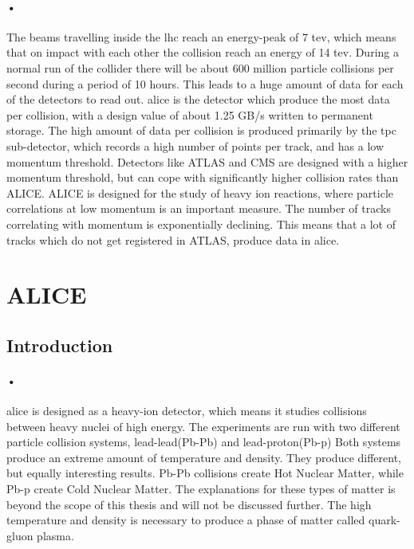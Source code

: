 \documentclass[a4paper, 12pt]{report}
\begin{document}
\paragraph{•}
The beams travelling inside the \gls{lhc} reach an energy-peak of 7 \gls{tev}, which means that on impact with each other the collision reach an energy of 14 \gls{tev}\cite{lhc-pdf}.
During a normal run of the collider there will be about 600 million particle collisions per second during a period of 10 hours.
This leads to a huge amount of data for each of the detectors to read out.
\gls{alice} is the detector which produce the most data per collision, with a design value of about 1.25 GB/s written to permanent storage.
The high amount of data per collision is produced primarily by the \gls{tpc} sub-detector, which records a high number of points per track, and has a low momentum threshold. Detectors like ATLAS and CMS  are designed with a higher momentum threshold, but can cope with significantly higher collision rates than ALICE.
ALICE is designed for the study of heavy ion reactions, where particle correlations at low momentum is an important measure.
The number of tracks correlating with momentum is exponentially declining.
This means that a lot of tracks which do not get registered in ATLAS, produce data in \gls{alice}.

\section{ALICE}
\subsection{Introduction}

\paragraph{•}
\gls{alice} is designed as a heavy-ion detector, which means it studies collisions between heavy nuclei of high energy\cite{alice-home}.
The experiments are run with two different particle collision systems, lead-lead(Pb-Pb) and lead-proton(Pb-p)
Both systems produce an extreme amount of temperature and density.
They produce different, but equally interesting results.
Pb-Pb collisions create Hot Nuclear Matter, while Pb-p create Cold Nuclear Matter.
The explanations for these types of matter is beyond the scope of this thesis and will not be discussed further.
The high temperature and density is necessary to produce a phase of matter called quark-gluon plasma.
\end{document}
